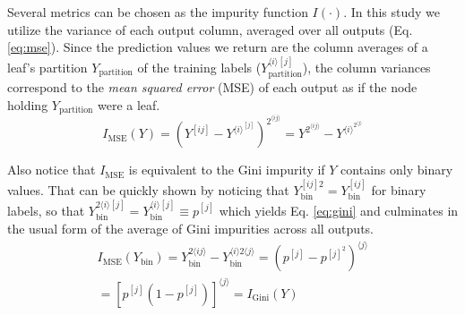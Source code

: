 \documentclass[conference]{IEEEtran}
\newcommand{\el}[1]{^{[#1]}}
\newcommand{\mel}[1]{^{\langle #1 \rangle}}
\newcommand{\angled}[1]{\langle #1 \rangle}
\newcommand{\avg}[1]{\left\langle#1\right\rangle}
\begin{document}
Several metrics can be chosen as the impurity function $I(\cdot)$. In this study we utilize the variance of each output column, averaged over all outputs (Eq. \ref{eq:mse}). Since the prediction values we return are the column averages of a leaf's partition $Y_\text{partition}$ of the training labels ($Y_\text{partition}^{\langle i\rangle[j]}$), the column variances correspond to the \emph{mean squared error} (MSE) of each output as if the node holding $Y_\text{partition}$ were a leaf.
%
\begin{equation}
    I_\text{MSE}(Y)
        = (Y\el{ij} - Y\mel i\el j)^2\mel{ij}
        = Y^2\mel{ij} - Y\mel i^2\mel j
    \label{eq:mse}
\end{equation}
%
%

Also notice that $I_\text{MSE}$ is equivalent to the Gini impurity if $Y$ contains only binary values. That can be quickly shown by noticing that $Y_\text{bin}^{[ij]2} = Y_\text{bin}\el{ij}$ for binary labels, so that $Y_\text{bin}^{2\angled{i}[j]}=Y_\text{bin}^{\angled i [j]}\equiv p\el j$ which yields Eq. \ref{eq:gini} and culminates in the usual form of the average of Gini impurities across all outputs.
\begin{multline}
    I_\text{MSE}(Y_\text{bin})
        = Y_\text{bin}^{2\angled{ij}} - Y_\text{bin}^{\angled{i}2\angled j}
        = (p\el j  - p\el j^2)\mel j\\
        = [p\el j(1 - p\el j)]\mel j
    = I_\text{Gini}(Y)
    \label{eq:gini}
\end{multline}
\end{document}
